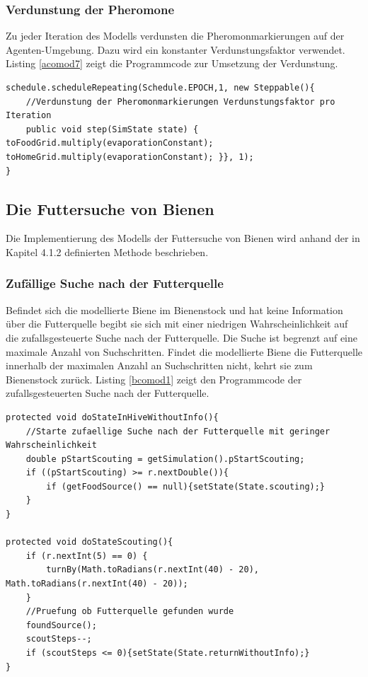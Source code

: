 \documentclass[a4paper, 11pt]{article}
\begin{document}
\subsubsection{Verdunstung der Pheromone}
Zu jeder Iteration des Modells verdunsten die Pheromonmarkierungen auf der Agenten-Umgebung. Dazu wird ein konstanter Verdunstungsfaktor verwendet. Listing \ref{acomod7} zeigt die Programmcode zur Umsetzung der Verdunstung.\newline
\begin{lstlisting}[caption= Ameisen: Verdunstung der Pheromone,label = acomod7]
schedule.scheduleRepeating(Schedule.EPOCH,1, new Steppable(){
	//Verdunstung der Pheromonmarkierungen Verdunstungsfaktor pro Iteration
	public void step(SimState state) { toFoodGrid.multiply(evaporationConstant); toHomeGrid.multiply(evaporationConstant); }}, 1);
}
\end{lstlisting}

\subsection{Die Futtersuche von Bienen}
Die Implementierung des Modells der Futtersuche von Bienen wird anhand der in Kapitel 4.1.2 definierten Methode beschrieben.
\subsubsection{Zufällige Suche nach der Futterquelle}
Befindet sich die modellierte Biene im Bienenstock und hat keine Information über die Futterquelle begibt sie sich mit einer niedrigen Wahrscheinlichkeit auf die zufallsgesteuerte Suche nach der Futterquelle. Die Suche ist begrenzt auf eine maximale Anzahl von Suchschritten. Findet die modellierte Biene die Futterquelle innerhalb der maximalen Anzahl an Suchschritten nicht, kehrt sie zum Bienenstock zurück. Listing \ref{bcomod1} zeigt den Programmcode der zufallsgesteuerten Suche nach der Futterquelle.\newline
\begin{lstlisting}[caption= Bienen: Zufällige Suche nach der Futterquelle,label = bcomod1]
protected void doStateInHiveWithoutInfo(){
	//Starte zufaellige Suche nach der Futterquelle mit geringer Wahrscheinlichkeit
	double pStartScouting = getSimulation().pStartScouting;
	if ((pStartScouting) >= r.nextDouble()){
		if (getFoodSource() == null){setState(State.scouting);}
	}
}

protected void doStateScouting(){
	if (r.nextInt(5) == 0) {
		turnBy(Math.toRadians(r.nextInt(40) - 20), Math.toRadians(r.nextInt(40) - 20));
	}
	//Pruefung ob Futterquelle gefunden wurde
	foundSource();
	scoutSteps--;
	if (scoutSteps <= 0){setState(State.returnWithoutInfo);}
}
\end{lstlisting}
\newpage
\end{document}
